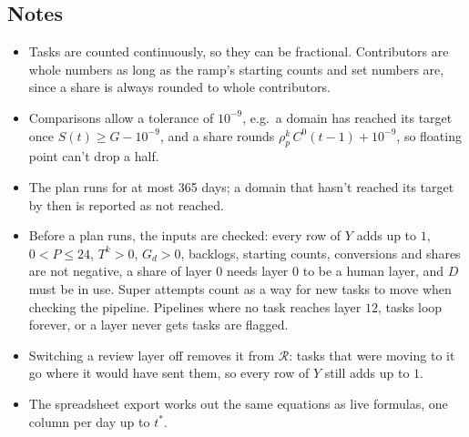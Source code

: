 \documentclass{article}
\begin{document}
\subsection*{Notes}
\begin{itemize}
  \item Tasks are counted continuously, so they can be fractional. Contributors are whole numbers as long as the ramp's starting counts and set numbers are, since a share is always rounded to whole contributors.

  \item Comparisons allow a tolerance of $10^{-9}$, e.g.\ a domain has reached its target once $S(t) \ge G - 10^{-9}$, and a share rounds $\rho^k_p\, C^0(t-1) + 10^{-9}$, so floating point can't drop a half.

  \item The plan runs for at most 365 days; a domain that hasn't reached its target by then is reported as not reached.

  \item Before a plan runs, the inputs are checked: every row of $Y$ adds up to $1$, $0 < P \le 24$, $T^k > 0$, $G_d > 0$, backlogs, starting counts, conversions and shares are not negative, a share of layer $0$ needs layer $0$ to be a human layer, and $D$ must be in use. Super attempts count as a way for new tasks to move when checking the pipeline. Pipelines where no task reaches layer $12$, tasks loop forever, or a layer never gets tasks are flagged.

  \item Switching a review layer off removes it from $\mathcal{R}$: tasks that were moving to it go where it would have sent them, so every row of $Y$ still adds up to $1$.

  \item The spreadsheet export works out the same equations as live formulas, one column per day up to $t^*$.
\end{itemize}
\end{document}
